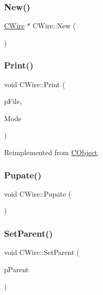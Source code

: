 \mbox{\label{classCWire_ad3c0d423ef6dc81227d3e16803b1cf17}} 
\subsubsection{\texorpdfstring{New()}{New()}}
{\footnotesize\ttfamily \mbox{\hyperlink{classCWire}{C\+Wire}} $\ast$ C\+Wire\+::\+New (\begin{DoxyParamCaption}{ }\end{DoxyParamCaption})\hspace{0.3cm}{\ttfamily [static]}}

\mbox{\label{classCWire_a76b2e23a425ddd51f02f41ba2caf3134}} 
\subsubsection{\texorpdfstring{Print()}{Print()}}
{\footnotesize\ttfamily void C\+Wire\+::\+Print (\begin{DoxyParamCaption}\item[{F\+I\+LE $\ast$}]{p\+File,  }\item[{int}]{Mode }\end{DoxyParamCaption})\hspace{0.3cm}{\ttfamily [virtual]}}



Reimplemented from \mbox{\hyperlink{classCObject_a75afd905b2d14ed374c75d90f079a389}{C\+Object}}.

\mbox{\label{classCWire_afc0e5cf89e354b121793c11ac460aa52}} 
\subsubsection{\texorpdfstring{Pupate()}{Pupate()}}
{\footnotesize\ttfamily void C\+Wire\+::\+Pupate (\begin{DoxyParamCaption}{ }\end{DoxyParamCaption})}

\mbox{\label{classCWire_a5eecb0e93a2609930901b265ed4fc3de}} 
\subsubsection{\texorpdfstring{SetParent()}{SetParent()}}
{\footnotesize\ttfamily void C\+Wire\+::\+Set\+Parent (\begin{DoxyParamCaption}\item[{\mbox{\hyperlink{classCNet}{C\+Net}} $\ast$}]{p\+Parent }\end{DoxyParamCaption})}

